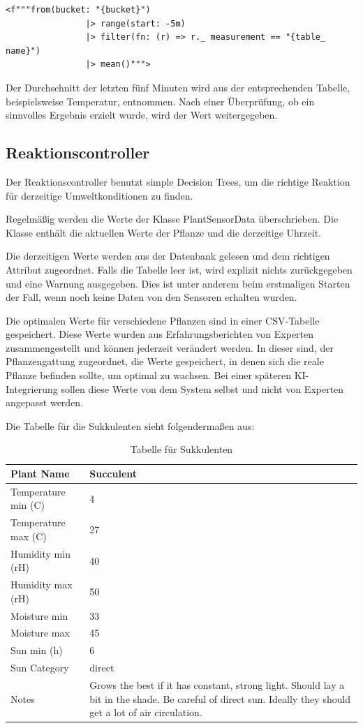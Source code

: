 \begin{verbatim}
<f"""from(bucket: "{bucket}")
                |> range(start: -5m)
                |> filter(fn: (r) => r._ measurement == "{table_ name}")
                |> mean()""">
\end{verbatim}

Der Durchschnitt der letzten fünf Minuten wird aus der entsprechenden Tabelle, beispielsweise Temperatur, entnommen. Nach einer Überprüfung, ob ein sinnvolles Ergebnis erzielt wurde, wird der Wert weitergegeben.

\subsection{Reaktionscontroller}
Der Reaktionscontroller benutzt simple Decision Trees, um die richtige Reaktion für derzeitige Umweltkonditionen zu finden. 

Regelmäßig werden die Werte der Klasse PlantSensorData überschrieben. Die Klasse enthält die aktuellen Werte der Pflanze und die derzeitige Uhrzeit.

Die derzeitigen Werte werden aus der Datenbank gelesen und dem richtigen Attribut zugeordnet. Falls die Tabelle leer ist, wird explizit nichts zurückgegeben und eine Warnung ausgegeben. Dies ist unter anderem beim erstmaligen Starten der Fall, wenn noch keine Daten von den Sensoren erhalten wurden.

Die optimalen Werte für verschiedene Pflanzen sind in einer CSV-Tabelle gespeichert. Diese Werte wurden aus Erfahrungsberichten von Experten zusammengestellt und können jederzeit verändert werden. In dieser sind, der Pflanzengattung zugeordnet, die Werte gespeichert, in denen sich die reale Pflanze befinden sollte, um optimal zu wachsen. Bei einer späteren KI-Integrierung sollen diese Werte von dem System selbst und nicht von Experten angepasst werden.

Die Tabelle für die Sukkulenten sieht folgendermaßen aus:

\begin{table}
    \centering
    \begin{tabular}{|p{5cm}|p{7cm}|}
         Plant Name&Succulent \\ \hline
         Temperature min (C)&4 \\ \hline
         Temperature max (C)&27 \\ \hline
         Humidity min (rH)&40 \\ \hline
         Humidity max (rH)&50 \\ \hline
         Moisture min&33 \\ \hline
         Moisture max&45 \\ \hline
         Sun min (h)&6 \\ \hline
         Sun Category&direct \\ \hline
         Notes&Grows the best if it has constant, strong light. Should lay a bit in the shade. Be careful of direct sun. Ideally they should get a lot of air circulation. \\ \hline
    \end{tabular}
    \caption{Tabelle für Sukkulenten}
    \label{tab:my_label}
\end{table}

